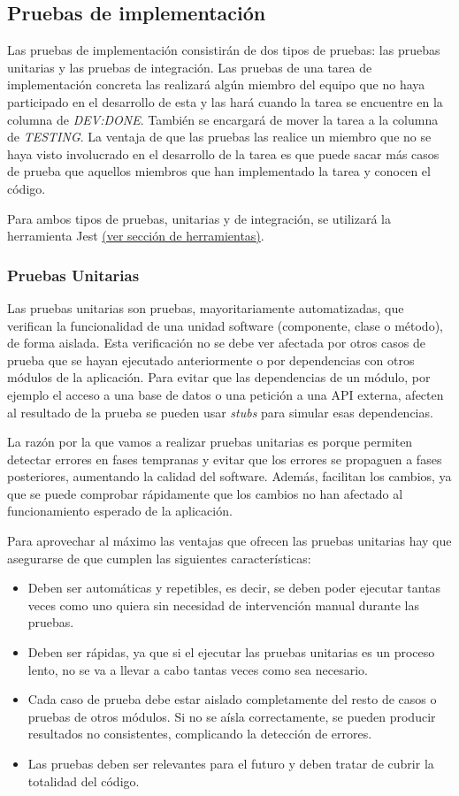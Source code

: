 \subsection{Pruebas de implementación}
Las pruebas de implementación consistirán de dos tipos de pruebas: las pruebas unitarias y las pruebas de integración. Las pruebas de una tarea de implementación concreta las realizará algún miembro del equipo que no haya participado en el desarrollo de esta y las hará cuando la tarea se encuentre en la columna de \textit{DEV:DONE}. También se encargará de mover la tarea a la columna de \textit{TESTING}. La ventaja de que las pruebas las realice un miembro que no se haya visto involucrado en el desarrollo de la tarea es que puede sacar más casos de prueba que aquellos miembros que han implementado la tarea y conocen el código.

Para ambos tipos de pruebas, unitarias y de integración, se utilizará la herramienta Jest \underline{(ver sección de herramientas)}.
\subsubsection{Pruebas Unitarias}
Las pruebas unitarias son pruebas, mayoritariamente automatizadas, que verifican la funcionalidad de una unidad software (componente, clase o método), de forma aislada. Esta verificación no se debe ver afectada por otros casos de prueba que se hayan ejecutado anteriormente o por dependencias con otros módulos de la aplicación. Para evitar que las dependencias de un módulo, por ejemplo el acceso a una base de datos o una petición a una API externa, afecten al resultado de la prueba se pueden usar \textit{stubs} para simular esas dependencias.

La razón por la que vamos a realizar pruebas unitarias es porque permiten detectar errores en fases tempranas y evitar que los errores se propaguen a fases posteriores, aumentando la calidad del software. Además, facilitan los cambios, ya que se puede comprobar rápidamente que los cambios no han afectado al funcionamiento esperado de la aplicación.

Para aprovechar al máximo las ventajas que ofrecen las pruebas unitarias hay que asegurarse de que cumplen las siguientes características:
\begin{itemize}
    \item Deben ser automáticas y repetibles, es decir, se deben poder ejecutar tantas veces como uno quiera sin necesidad de intervención manual durante las pruebas.
    \item Deben ser rápidas, ya que si el ejecutar las pruebas unitarias es un proceso lento, no se va a llevar a cabo tantas veces como sea necesario.
    \item Cada caso de prueba debe estar aislado completamente del resto de casos o pruebas de otros módulos. Si no se aísla correctamente, se pueden producir resultados no consistentes, complicando la detección de errores.
    \item Las pruebas deben ser relevantes para el futuro y deben tratar de cubrir la totalidad del código.
\end{itemize}

